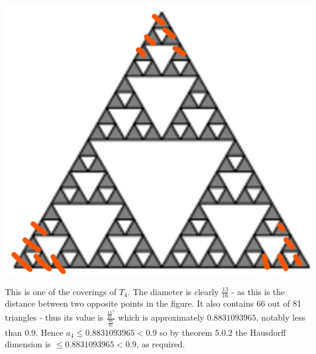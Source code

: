\begin{center}
    \includegraphics[scale=0.5]{solutions/section-5-0/diag-5-0-4.jpg}
\end{center}

This is one of the coverings of \(T_4\). The diameter is clearly \(\frac{13}{16}\) - as this is the distance between two opposite points in the figure. It also contains 66 out of 81 triangles - thus its value is \(\frac{\frac{13}{16}^s}{\frac{66}{81}}\) which is approximately \(0.8831093965\), notably less than \(0.9\). Hence \(a_4 \leq 0.8831093965 < 0.9\) so by theorem 5.0.2 the Hausdorff dimension is \(\leq 0.8831093965 < 0.9\), as required.
